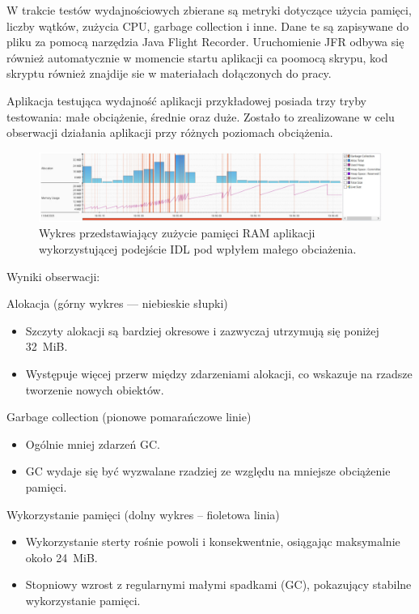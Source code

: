 \documentclass[runningheads,12pt]{llncs}
\begin{document}
W trakcie testów wydajnościowych zbierane są metryki dotyczące użycia pamięci, liczby wątków, zużycia CPU, garbage collection i inne. Dane te są zapisywane do pliku za pomocą narzędzia Java Flight Recorder. Uruchomienie JFR odbywa się również automatycznie w momencie startu aplikacji ca poomocą skrypu, kod skryptu również znajdije sie w materiałach dołączonych do pracy. 

Aplikacja testująca wydajność aplikacji przykładowej posiada trzy tryby testowania: małe obciążenie, średnie oraz duże. Zostało to zrealizowane w celu obserwacji działania aplikacji przy różnych poziomach obciążenia.

\newpage

\begin{figure}
    \includegraphics[width=\linewidth]{images/idl-memory-low-graph.jpg}
    \caption{Wykres przedstawiający zużycie pamięci RAM aplikacji wykorzystującej podejście IDL pod wpłyłem małego obciażenia.} \label{fig1}
\end{figure}

Wyniki obserwacji:

Alokacja (górny wykres — niebieskie słupki)

\begin{itemize}
    \item Szczyty alokacji są bardziej okresowe i zazwyczaj utrzymują się poniżej 32~MiB.
    \item Występuje więcej przerw między zdarzeniami alokacji, co wskazuje na rzadsze tworzenie nowych obiektów.
\end{itemize}

Garbage collection (pionowe pomarańczowe linie)

\begin{itemize}
    \item Ogólnie mniej zdarzeń GC.
    \item GC wydaje się być wyzwalane rzadziej ze względu na mniejsze obciążenie pamięci.
\end{itemize}

Wykorzystanie pamięci (dolny wykres – fioletowa linia)

\begin{itemize}
  \item Wykorzystanie sterty rośnie powoli i konsekwentnie, osiągając maksymalnie około 24~MiB.
  \item Stopniowy wzrost z regularnymi małymi spadkami (GC), pokazujący stabilne wykorzystanie pamięci.
\end{itemize}
\end{document}
